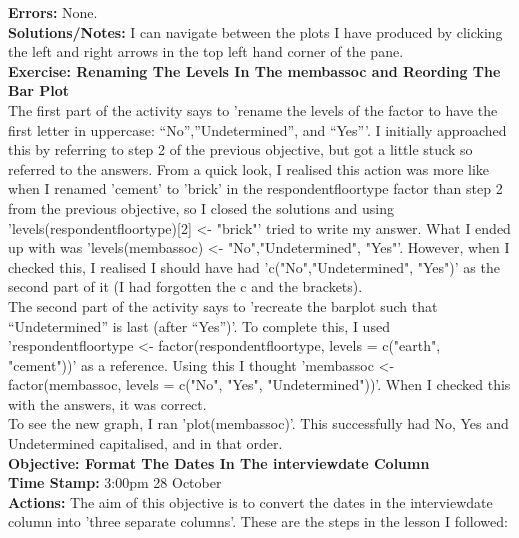 \documentclass{article}
\begin{document}
\begin{FlushLeft}
\textbf{Errors:} None.\\
\textbf{Solutions/Notes:} I can navigate between the plots I have produced by clicking the left and right arrows in the top left hand corner of the pane.\\
\vspace{5mm}
\textbf{Exercise: Renaming The Levels In The memb\textunderscore assoc and Reording The Bar Plot}\\ 
The first part of the activity says to 'rename the levels of the factor to have the first letter in uppercase: “No”,”Undetermined”, and “Yes”'. I initially approached this by referring to step 2 of the previous objective, but got a little stuck so referred to the answers. From a quick look, I realised this action was more like when I renamed 'cement' to 'brick' in the respondent\textunderscore floor\textunderscore type factor than step 2 from the previous objective, so I closed the solutions and using 'levels(respondent\textunderscore floor\textunderscore type)[2] \textless - "brick"' tried to write my answer. What I ended up with was 'levels(memb\textunderscore assoc) \textless - "No","Undetermined", "Yes"'. However, when I checked this, I realised I should have had 'c("No","Undetermined", "Yes")' as the second part of it (I had forgotten the c and the brackets).\\
The second part of the activity says to 'recreate the barplot such that “Undetermined” is last (after “Yes”)'. To complete this, I used 'respondent\textunderscore floor\textunderscore type \textless - factor(respondent\textunderscore floor\textunderscore type, levels = c("earth", "cement"))' as a reference. Using this I thought 'memb\textunderscore assoc \textless - factor(memb\textunderscore assoc, levels = c("No", "Yes", "Undetermined"))'. When I checked this with the answers, it was correct.\\
To see the new graph, I ran 'plot(memb\textunderscore assoc)'. This successfully had No, Yes and Undetermined capitalised, and in that order.\\
\vspace{5mm}
\textbf{Objective: Format The Dates In The interview\textunderscore date Column}\\ 
\textbf{Time Stamp:} 3:00pm 28 October\\
\textbf{Actions:} The aim of this objective is to convert the dates in the interview\textunderscore date column into 'three separate columns'. These are the steps in the lesson I followed:
\begin{itemize}

\end{itemize}
\end{FlushLeft}
\end{document}
